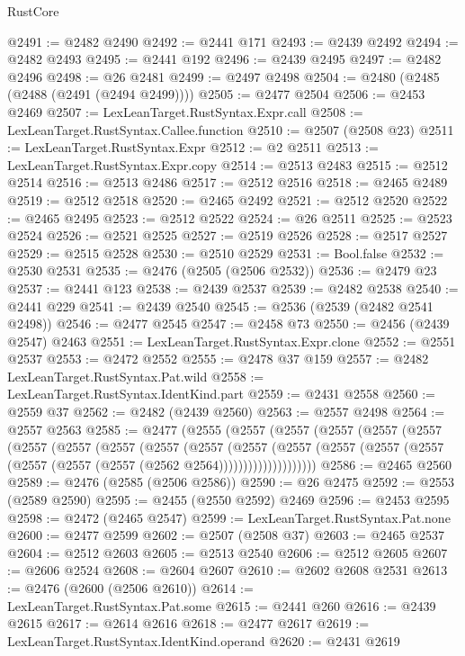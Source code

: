 \begin{lexlean}{RustCore}
\begin{coremodule}
@2491 := @2482 @2490
@2492 := @2441 @171
@2493 := @2439 @2492
@2494 := @2482 @2493
@2495 := @2441 @192
@2496 := @2439 @2495
@2497 := @2482 @2496
@2498 := @26 @2481
@2499 := @2497 @2498
@2504 := @2480 (@2485 (@2488 (@2491 (@2494 @2499))))
@2505 := @2477 @2504
@2506 := @2453 @2469
@2507 := LexLeanTarget.RustSyntax.Expr.call
@2508 := LexLeanTarget.RustSyntax.Callee.function
@2510 := @2507 (@2508 @23)
@2511 := LexLeanTarget.RustSyntax.Expr
@2512 := @2 @2511
@2513 := LexLeanTarget.RustSyntax.Expr.copy
@2514 := @2513 @2483
@2515 := @2512 @2514
@2516 := @2513 @2486
@2517 := @2512 @2516
@2518 := @2465 @2489
@2519 := @2512 @2518
@2520 := @2465 @2492
@2521 := @2512 @2520
@2522 := @2465 @2495
@2523 := @2512 @2522
@2524 := @26 @2511
@2525 := @2523 @2524
@2526 := @2521 @2525
@2527 := @2519 @2526
@2528 := @2517 @2527
@2529 := @2515 @2528
@2530 := @2510 @2529
@2531 := Bool.false
@2532 := @2530 @2531
@2535 := @2476 (@2505 (@2506 @2532))
@2536 := @2479 @23
@2537 := @2441 @123
@2538 := @2439 @2537
@2539 := @2482 @2538
@2540 := @2441 @229
@2541 := @2439 @2540
@2545 := @2536 (@2539 (@2482 @2541 @2498))
@2546 := @2477 @2545
@2547 := @2458 @73
@2550 := @2456 (@2439 @2547) @2463
@2551 := LexLeanTarget.RustSyntax.Expr.clone
@2552 := @2551 @2537
@2553 := @2472 @2552
@2555 := @2478 @37 @159
@2557 := @2482 LexLeanTarget.RustSyntax.Pat.wild
@2558 := LexLeanTarget.RustSyntax.IdentKind.part
@2559 := @2431 @2558
@2560 := @2559 @37
@2562 := @2482 (@2439 @2560)
@2563 := @2557 @2498
@2564 := @2557 @2563
@2585 := @2477
    (@2555
      (@2557
        (@2557
          (@2557
            (@2557
              (@2557
                (@2557
                  (@2557
                    (@2557
                      (@2557
                        (@2557
                          (@2557
                            (@2557
                              (@2557
                                (@2557 (@2557 (@2557 (@2557 (@2557 (@2562 @2564))))))))))))))))))))
@2586 := @2465 @2560
@2589 := @2476 (@2585 (@2506 @2586))
@2590 := @26 @2475
@2592 := @2553 (@2589 @2590)
@2595 := @2455 (@2550 @2592) @2469
@2596 := @2453 @2595
@2598 := @2472 (@2465 @2547)
@2599 := LexLeanTarget.RustSyntax.Pat.none
@2600 := @2477 @2599
@2602 := @2507 (@2508 @37)
@2603 := @2465 @2537
@2604 := @2512 @2603
@2605 := @2513 @2540
@2606 := @2512 @2605
@2607 := @2606 @2524
@2608 := @2604 @2607
@2610 := @2602 @2608 @2531
@2613 := @2476 (@2600 (@2506 @2610))
@2614 := LexLeanTarget.RustSyntax.Pat.some
@2615 := @2441 @260
@2616 := @2439 @2615
@2617 := @2614 @2616
@2618 := @2477 @2617
@2619 := LexLeanTarget.RustSyntax.IdentKind.operand
@2620 := @2431 @2619

\end{coremodule}
\end{lexlean}

